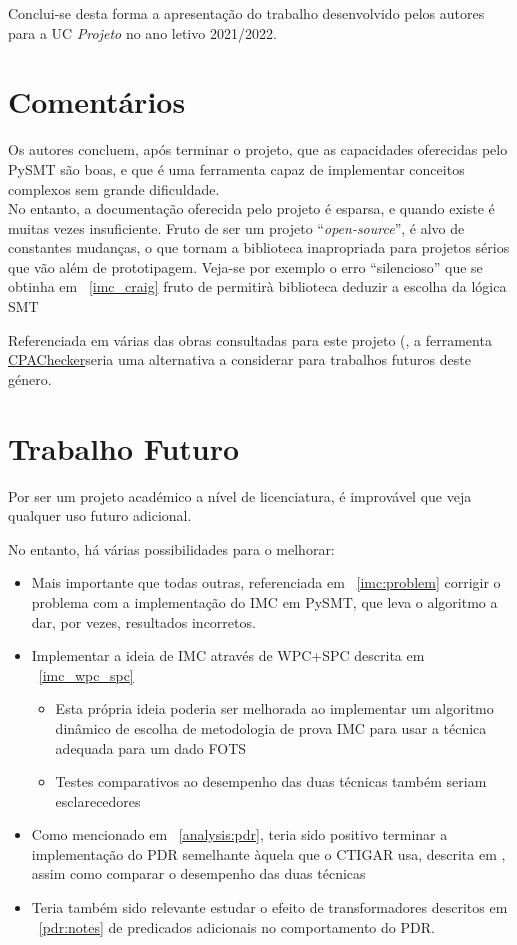 \documentclass[11pt,a4paper]{report}%
\def\proj{\emph{Projeto}\xspace}
\def\cpa{\href{https://cpachecker.sosy-lab.org/}{CPAChecker\xspace}}
\begin{document}
Conclui-se desta forma a apresentação do trabalho desenvolvido pelos autores
para a UC \proj no ano letivo 2021/2022.

\section{Comentários}

Os autores concluem, após terminar o projeto, que as capacidades oferecidas
pelo PySMT são boas, e que é uma ferramenta capaz de implementar conceitos
complexos sem grande dificuldade.\\

No entanto, a documentação oferecida pelo projeto é esparsa, e quando existe
é muitas vezes insuficiente. Fruto de ser um projeto ``\textit{open-source}'',
é alvo de constantes mudanças, o que tornam a biblioteca inapropriada para
projetos sérios que vão além de prototipagem. Veja-se por exemplo o erro
``silencioso'' que se obtinha em ~\ref{imc_craig} fruto de permitirà biblioteca
deduzir a escolha da lógica SMT

Referenciada em várias das obras consultadas para este projeto (\cite{ctigar, kind_state_of_art, interpolation_state_of_art},
a ferramenta \cpa seria uma alternativa a considerar para trabalhos futuros
deste género.

\section{Trabalho Futuro}

Por ser um projeto académico a nível de licenciatura, é improvável que veja
qualquer uso futuro adicional.

No entanto, há várias possibilidades para o melhorar:
\begin{itemize}
    \item Mais importante que todas outras, referenciada em ~\ref{imc:problem} \textemdash
    corrigir o problema com a implementação do IMC em PySMT, que leva o algoritmo
    a dar, por vezes, resultados incorretos.
    \item Implementar a ideia de IMC através de WPC+SPC descrita em ~\ref{imc_wpc_spc}
    \begin{itemize}
        \item Esta própria ideia poderia ser melhorada ao implementar um algoritmo
        dinâmico de escolha de metodologia de prova IMC para usar a técnica adequada
        para um dado FOTS
        \item Testes comparativos ao desempenho das duas técnicas também seriam
        esclarecedores
    \end{itemize}
    \item Como mencionado em ~\ref{analysis:pdr}, teria sido positivo terminar a
    implementação do PDR semelhante àquela que o CTIGAR usa, descrita em \cite{ctigar}, assim como comparar o desempenho das duas técnicas
    \item Teria também sido relevante estudar o efeito de transformadores
    descritos em ~\ref{pdr:notes} de predicados adicionais no comportamento
    do PDR.
\end{itemize}
\end{document}
